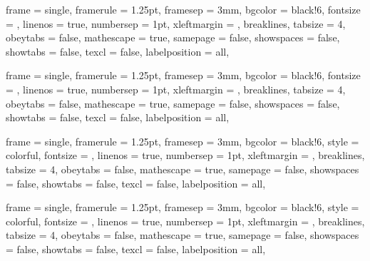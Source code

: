  {
  frame = single,
  framerule = 1.25pt,
  framesep = 3mm,
  bgcolor = black!6,
  fontsize = \small,
  linenos = true,
  numbersep = 1pt,
  xleftmargin = \parindent,
  breaklines,
  tabsize = 4,
  obeytabs = false,
  mathescape = true,
  samepage = false,
  showspaces = false,
  showtabs = false,
  texcl = false,
  labelposition = all,
}

 {
  frame = single,
  framerule = 1.25pt,
  framesep = 3mm,
  bgcolor = black!6,
  fontsize = \small,
  linenos = true,
  numbersep = 1pt,
  xleftmargin = \parindent,
  breaklines,
  tabsize = 4,
  obeytabs = false,
  mathescape = true,
  samepage = false,
  showspaces = false,
  showtabs = false,
  texcl = false,
  labelposition = all,
}

 {
  frame = single,
  framerule = 1.25pt,
  framesep = 3mm,
  bgcolor = black!6,
  style = colorful,
  fontsize = \small,
  linenos = true,
  numbersep = 1pt,
  xleftmargin = \parindent,
  breaklines,
  tabsize = 4,
  obeytabs = false,
  mathescape = true,
  samepage = false,
  showspaces = false,
  showtabs = false,
  texcl = false,
  labelposition = all,
}

 {
  frame = single,
  framerule = 1.25pt,
  framesep = 3mm,
  bgcolor = black!6,
  style = colorful,
  fontsize = \small,
  linenos = true,
  numbersep = 1pt,
  xleftmargin = \parindent,
  breaklines,
  tabsize = 4,
  obeytabs = false,
  mathescape = true,
  samepage = false,
  showspaces = false,
  showtabs = false,
  texcl = false,
  labelposition = all,
}

\renewcommand{\theFancyVerbLine}{\sffamily \small \arabic{FancyVerbLine}}


\newcommand{\imgInline}[1]{\texttt{[image: \#1]}}

\newcommand{\myFolder}[1]{\faFolderOpen\ {#1}}
\newcommand{\myFile}[1]{\faFileTextO\ {#1} }
\newcommand{\myPdf}[1]{\faFilePdfO\ {#1.pdf}}
\newcommand{\myZip}[1]{\faFileZipO\ {#1.zip}}
\newcommand{\myPy}[1]{\faFileTextO\ {#1.py} \imgInline{Logo_Python.png}}
\newcommand{\myJs}[1]{\faFileTextO\ {#1.js} \imgInline{Logo_JS.png}}
\newcommand{\myPhp}[1]{\faFileTextO\ {#1.php} \imgInline{Logo_PHP.png}}
\newcommand{\myHtml}[1]{\faFileTextO\ {#1.html} \imgInline{Logo_HTML.png}}
\newcommand{\myCss}[1]{\faFileTextO\ {#1.css} \imgInline{Logo_CSS.png}}
\newcommand{\myImg}[1]{\faFileImageO\ {#1.png}}


